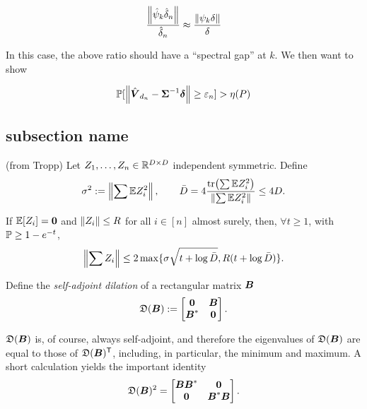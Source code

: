 \documentclass[10pt]{article}
\begin{document}
\begin{align}
	\frac{\left \lVert\hat{\psi}_k \hat{\delta}_n \right \rVert}{\hat{\delta}_n} \approx  	\frac{\left \lVert{\psi}_k {\delta} \right \rVert}{{\delta}} 
\end{align}

In this case, the above ratio should have a ``spectral gap'' at $k$.
We then want to show

\begin{align}
	\mathbb{P}[\left \lVert\hat{\boldsymbol{V}}_{d_n}- \boldsymbol{\Sigma}^{-1}\boldsymbol{\delta}  \right \rVert \geq \varepsilon_n] > \eta(P)
\end{align}




\subsection{subsection name} %
\label{sub:subsection_name}


\begin{thm}(from Tropp)
Let $Z_1,\ldots, Z_n \in \mathbb{R}^{D \times D}$ independent symmetric.  	Define
	\begin{align}
		\sigma^2 := \left \lVert\sum \mathbb{E} Z_i^2  \right \rVert, \qquad \bar{D} = 4 \frac{{\operatorname{tr}\!\left(\sum \mathbb{E} Z_i^2 \right)}}{\left \lVert\sum \mathbb{E}  Z_i^2   \right \rVert} \leq 4 D.
	\end{align}

If  $\mathbb{E}[Z_i]=\boldsymbol{0}$ and $\left \lVert Z_i \right \rVert \leq R$ for all $i \in [n]$ almost surely,  
then, $\forall t \geq 1$, with $\mathbb{P} \geq 1-e^{-t}$,
\begin{align}
	\left \lVert\sum Z_i \right \rVert \leq 2 \max \{\sigma \sqrt{t + \log \bar{D}}, R (t+ \log \bar{D})\}.
\end{align}

\end{thm}

Define the \emph{self-adjoint dilation} of a rectangular matrix $\boldsymbol{B}$
\begin{align}
	\mathfrak{D}(\boldsymbol{B}) := 
	\begin{bmatrix}
		\boldsymbol{0} & \boldsymbol{B} \\
		\boldsymbol{B}^* & \boldsymbol{0}
	\end{bmatrix}.
\end{align}

$\mathfrak{D}(\boldsymbol{B})$ is, of course,  always self-adjoint, and therefore the eigenvalues of $\mathfrak{D}(\boldsymbol{B})$ are equal to those of $\mathfrak{D}(\boldsymbol{B})^{\mathsf{T}}$, including, in particular, the minimum and maximum.  A short calculation yields the important identity
\begin{align}
	\mathfrak{D}(\boldsymbol{B})^2 = 
	\begin{bmatrix}
		\boldsymbol{BB}^* & \boldsymbol{0} \\
		\boldsymbol{0} & \boldsymbol{B}^*\boldsymbol{B}
	\end{bmatrix}.
\end{align}
\end{document}
